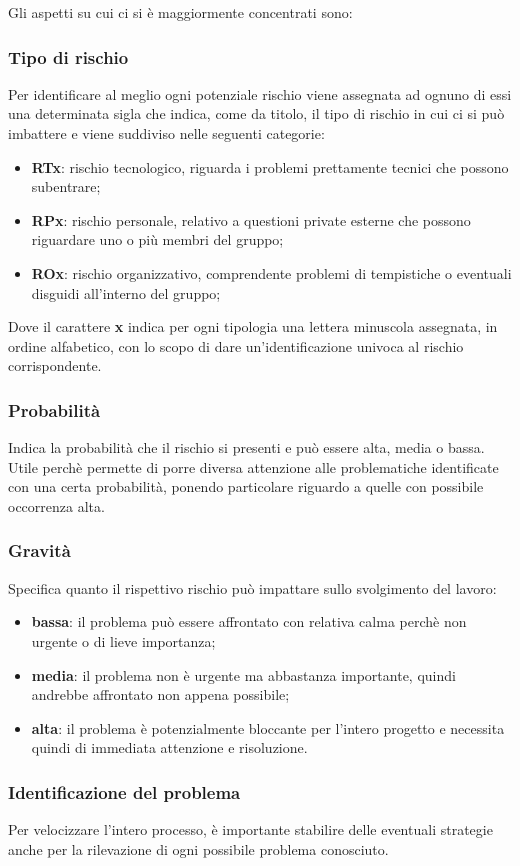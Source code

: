 Gli aspetti su cui ci si è maggiormente concentrati sono:

\subsubsection{Tipo di rischio}
    Per identificare al meglio ogni potenziale rischio viene assegnata ad ognuno di essi una determinata sigla che indica, come da titolo, il tipo di rischio in cui ci si può imbattere e viene suddiviso nelle seguenti categorie:
    \begin{itemize}
        \item \textbf{RTx}: rischio tecnologico, riguarda i problemi prettamente tecnici che possono subentrare;
        \item \textbf{RPx}: rischio personale, relativo a questioni private esterne che possono riguardare uno o più membri del gruppo;
        \item \textbf{ROx}: rischio organizzativo, comprendente problemi di tempistiche o eventuali disguidi all'interno del gruppo;
    \end{itemize}
    Dove il carattere \textbf{x} indica per ogni tipologia una lettera minuscola assegnata, in ordine alfabetico, con lo scopo di dare un'identificazione univoca al rischio corrispondente.
    
\subsubsection{Probabilità}
    Indica la probabilità che il rischio si presenti e può essere alta, media o bassa. Utile perchè permette di porre diversa attenzione alle problematiche identificate con una certa probabilità, ponendo particolare riguardo a quelle con possibile occorrenza alta.

\subsubsection{Gravità}
    Specifica quanto il rispettivo rischio può impattare sullo svolgimento del lavoro:
    \begin{itemize}
        \item \textbf{bassa}: il problema può essere affrontato con relativa calma perchè non urgente o di lieve importanza;
        \item \textbf{media}: il problema non è urgente ma abbastanza importante, quindi andrebbe affrontato non appena possibile;
        \item \textbf{alta}: il problema è potenzialmente bloccante per l'intero progetto e necessita quindi di immediata attenzione e risoluzione.
    \end{itemize}
    
\subsubsection{Identificazione del problema}
    Per velocizzare l'intero processo, è importante stabilire delle eventuali strategie anche per la rilevazione di ogni possibile problema conosciuto.
